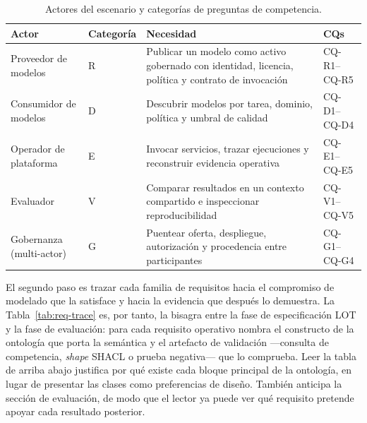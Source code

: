\documentclass[Afour,sagev,times]{sagej}
\newcommand{\cq}[1]{\textsf{#1}}
\begin{document}
\begin{table}[tb]
\small\sf\centering
\caption{Actores del escenario y categorías de preguntas de competencia.\label{tab:actors}}
\begin{tabular}{@{}p{3.5cm}p{2cm}p{7cm}p{2.5cm}@{}}
\toprule
\textbf{Actor} & \textbf{Categoría} & \textbf{Necesidad} & \textbf{CQs} \\
\midrule
Proveedor de modelos & R & Publicar un modelo como activo gobernado con identidad, licencia, política y contrato de invocación & \cq{CQ-R1}--\cq{CQ-R5} \\
Consumidor de modelos & D & Descubrir modelos por tarea, dominio, política y umbral de calidad & \cq{CQ-D1}--\cq{CQ-D4} \\
Operador de plataforma & E & Invocar servicios, trazar ejecuciones y reconstruir evidencia operativa & \cq{CQ-E1}--\cq{CQ-E5} \\
Evaluador & V & Comparar resultados en un contexto compartido e inspeccionar reproducibilidad & \cq{CQ-V1}--\cq{CQ-V5} \\
Gobernanza (multi-actor) & G & Puentear oferta, despliegue, autorización y procedencia entre participantes & \cq{CQ-G1}--\cq{CQ-G4} \\
\bottomrule
\end{tabular}
\end{table}

El segundo paso es trazar cada familia de requisitos hacia el compromiso de modelado que la satisface y hacia la evidencia que después lo demuestra. La Tabla~\ref{tab:req-trace} es, por tanto, la bisagra entre la fase de especificación LOT y la fase de evaluación: para cada requisito operativo nombra el constructo de la ontología que porta la semántica y el artefacto de validación ---consulta de competencia, \emph{shape} SHACL o prueba negativa--- que lo comprueba. Leer la tabla de arriba abajo justifica por qué existe cada bloque principal de la ontología, en lugar de presentar las clases como preferencias de diseño. También anticipa la sección de evaluación, de modo que el lector ya puede ver qué requisito pretende apoyar cada resultado posterior.
\end{document}
